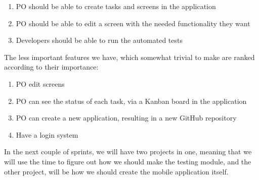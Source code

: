 \begin{enumerate}
    \item PO should be able to create tasks and screens in the application
    \item PO should be able to edit a screen with the needed functionality they want
    \item Developers should be able to run the automated tests
\end{enumerate}

The less important features we have, which somewhat trivial to make are ranked according to their importance:

\begin{enumerate}
    \item PO edit screens
    \item PO can see the status of each task, via a Kanban board in the application
    \item PO can create a new application, resulting in a new GitHub repository
    \item Have a login system
\end{enumerate}

In the next couple of sprints, we will have two projects in one, meaning that we will use the time to figure out how we should make the testing module, and the other project, will be how we should create the mobile application itself.
